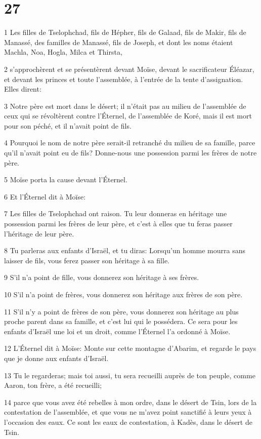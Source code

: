 \chapter{27}

\par 1 Les filles de Tselophchad, fils de Hépher, fils de Galaad, fils de Makir, fils de Manassé, des familles de Manassé, fils de Joseph, et dont les noms étaient Machla, Noa, Hogla, Milca et Thirsta,
\par 2 s'approchèrent et se présentèrent devant Moïse, devant le sacrificateur Éléazar, et devant les princes et toute l'assemblée, à l'entrée de la tente d'assignation. Elles dirent:
\par 3 Notre père est mort dans le désert; il n'était pas au milieu de l'assemblée de ceux qui se révoltèrent contre l'Éternel, de l'assemblée de Koré, mais il est mort pour son péché, et il n'avait point de fils.
\par 4 Pourquoi le nom de notre père serait-il retranché du milieu de sa famille, parce qu'il n'avait point eu de fils? Donne-nous une possession parmi les frères de notre père.
\par 5 Moïse porta la cause devant l'Éternel.
\par 6 Et l'Éternel dit à Moïse:
\par 7 Les filles de Tselophchad ont raison. Tu leur donneras en héritage une possession parmi les frères de leur père, et c'est à elles que tu feras passer l'héritage de leur père.
\par 8 Tu parleras aux enfants d'Israël, et tu diras: Lorsqu'un homme mourra sans laisser de fils, vous ferez passer son héritage à sa fille.
\par 9 S'il n'a point de fille, vous donnerez son héritage à ses frères.
\par 10 S'il n'a point de frères, vous donnerez son héritage aux frères de son père.
\par 11 S'il n'y a point de frères de son père, vous donnerez son héritage au plus proche parent dans sa famille, et c'est lui qui le possédera. Ce sera pour les enfants d'Israël une loi et un droit, comme l'Éternel l'a ordonné à Moïse.
\par 12 L'Éternel dit à Moïse: Monte sur cette montagne d'Abarim, et regarde le pays que je donne aux enfants d'Israël.
\par 13 Tu le regarderas; mais toi aussi, tu sera recueilli auprès de ton peuple, comme Aaron, ton frère, a été recueilli;
\par 14 parce que vous avez été rebelles à mon ordre, dans le désert de Tsin, lors de la contestation de l'assemblée, et que vous ne m'avez point sanctifié à leurs yeux à l'occasion des eaux. Ce sont les eaux de contestation, à Kadès, dans le désert de Tsin.
